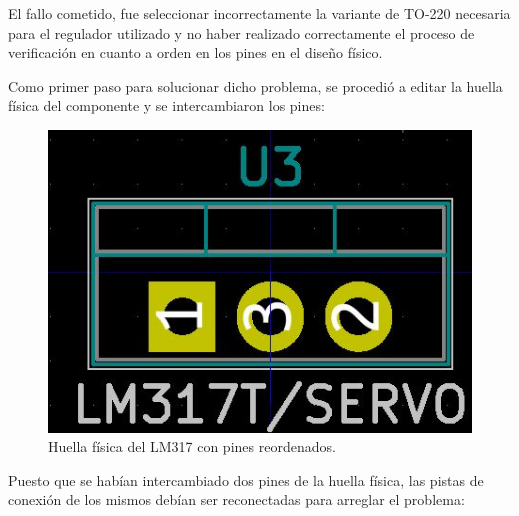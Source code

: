 \begin{itemize}
    El fallo cometido, fue seleccionar incorrectamente la variante de TO-220 necesaria para el regulador utilizado y no haber realizado correctamente el proceso de verificación en cuanto a orden en los pines en el diseño físico.
    
    Como primer paso para solucionar dicho problema, se procedió a editar la huella física del componente y se intercambiaron los pines:
    
    \begin{figure}[H]
    \centering 
    \includegraphics[width=0.45\linewidth]{pictures/FixedLM.JPG}
    \caption{Huella física del LM317 con pines reordenados.}
    \end{figure}
    
    Puesto que se habían intercambiado dos pines de la huella física, las pistas de conexión de los mismos debían ser reconectadas para arreglar el problema:
    

\end{itemize}
